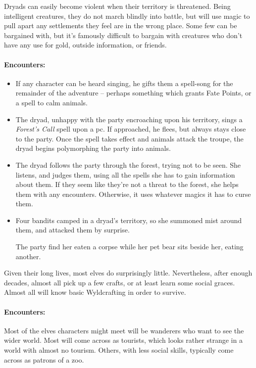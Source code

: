 \begin{multicols}{2}
Dryads can easily become violent when their territory is threatened.
Being intelligent creatures, they do not march blindly into battle, but will use magic to pull apart any settlements they feel are in the wrong place.
Some few can be bargained with, but it's famously difficult to bargain with creatures who don't have any use for gold, outside information, or friends.

\paragraph{Encounters:}

\begin{itemize}

  \item
  If any character can be heard singing, he gifts them a spell-song for the remainder of the adventure -- perhaps something which grants Fate Points, or a spell to calm animals.
  \item
  The dryad, unhappy with the party encroaching upon his territory, sings a \textit{Forest's Call} spell upon a \gls{pc}.%
  If approached, he flees, but always stays close to the party.
  Once the spell takes effect and animals attack the troupe, the dryad begins polymorphing the party into animals.
  \item
  The dryad follows the party through the forest, trying not to be seen.
  She listens, and judges them, using all the spells she has to gain information about them.
  If they seem like they're not a threat to the forest, she helps them with any encounters.
  Otherwise, it uses whatever magics it has to curse them.
  \item
  Four bandits camped in a dryad's territory, so she summoned mist around them, and attacked them by surprise.

  The party find her eaten a corpse while her pet bear sits beside her, eating another.

\end{itemize}

\label{elf}

Given their long lives, most elves do surprisingly little.
Nevertheless, after enough decades, almost all pick up a few crafts, or at least learn some social graces.
Almost all will know basic Wyldcrafting in order to survive.

\paragraph{Encounters:}
Most of the elves characters might meet will be wanderers who want to see the wider world.
Most will come across as tourists, which looks rather strange in a world with almost no tourism.
Others, with less social skills, typically come across as patrons of a zoo.


\end{multicols}
